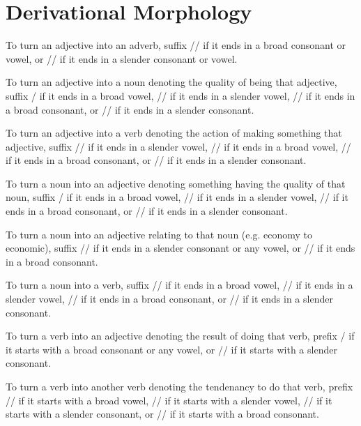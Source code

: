 \documentclass{article}
\begin{document}
\part{Derivational Morphology}
To turn an adjective into an adverb, suffix // if it ends in a broad consonant or vowel, or // if it ends in a slender consonant or vowel.

To turn an adjective into a noun denoting the quality of being that adjective, suffix / if it ends in a broad vowel, // if it ends in a slender vowel, // if it ends in a broad consonant, or // if it ends in a slender consonant.

To turn an adjective into a verb denoting the action of making something that adjective, suffix /\textipa{\textltailn}/ if it ends in a slender vowel, // if it ends in a broad vowel, // if it ends in a broad consonant, or // if it ends in a slender consonant.

To turn a noun into an adjective denoting something having the quality of that noun, suffix / if it ends in a broad vowel, // if it ends in a slender vowel, // if it ends in a broad consonant, or // if it ends in a slender consonant.

To turn a noun into an adjective relating to that noun (e.g. economy to economic), suffix // if it ends in a slender consonant or any vowel, or // if it ends in a broad consonant.

To turn a noun into a verb, suffix // if it ends in a broad vowel, /\textipa{\textbardotlessj}/ if it ends in a slender vowel, // if it ends in a broad consonant, or // if it ends in a slender consonant.

To turn a verb into an adjective denoting the result of doing that verb, prefix / if it starts with a broad consonant or any vowel, or // if it starts with a slender consonant.

To turn a verb into another verb denoting the tendenancy to do that verb, prefix // if it starts with a broad vowel, // if it starts with a slender vowel, // if it starts with a slender consonant, or // if it starts with a broad consonant.
\end{document}
